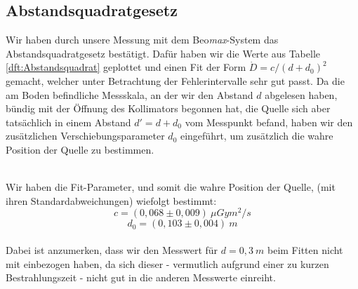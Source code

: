\subsection{Abstandsquadratgesetz}
Wir haben durch unsere Messung mit dem Beo\textit{max}-System das Abstandsquadratgesetz bestätigt. Dafür haben wir die Werte aus Tabelle \ref{dft:Abstandsquadrat} geplottet und einen Fit der Form $\dot{D} = c/(d+d_0)^2$ gemacht, welcher unter Betrachtung der Fehlerintervalle sehr gut passt. Da die am Boden befindliche Messskala, an der wir den Abstand $d$ abgelesen haben, bündig mit der Öffnung des Kollimators begonnen hat, die Quelle sich aber tatsächlich in einem Abstand $d' = d + d_0$ vom Messpunkt befand, haben wir den zusätzlichen Verschiebungsparameter $d_0$ eingeführt, um zusätzlich die wahre Position der Quelle zu bestimmen.

\begin{center}
	\minipanf    
        \label{fig:Abstandsquadrat}
    \minipend
    \vspace{5mm}
\end{center}
\ \\
Wir haben die Fit-Parameter, und somit die wahre Position der Quelle, (mit ihren Standardabweichungen) wiefolgt bestimmt:
\begin{equation*}
		c = (0,068 \pm 0,009)\ \unit{\mu Gy m^2/s}
\end{equation*}
\begin{equation*}
		d_0 = (0,103 \pm 0,004)\ \unit{m}
\end{equation*}
\ \\
Dabei ist anzumerken, dass wir den Messwert für $d=0,3\ \unit{m}$ beim Fitten nicht mit einbezogen haben, da sich dieser - vermutlich aufgrund einer zu kurzen Bestrahlungszeit - nicht gut in die anderen Messwerte einreiht.

